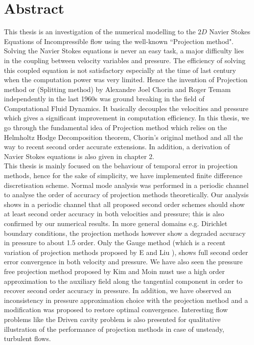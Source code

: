 \chapter*{Abstract}\label{abstract}




This thesis is an investigation of the numerical modelling to the $2D$ Navier Stokes Equations of Incompressible flow using the well-known ``Projection method". Solving the Navier Stokes equations is never an easy task, a major difficulty lies in the coupling between velocity variables and pressure. The efficiency of solving this coupled equation is not satisfactory especially at the time of last century when the computation power was very limited. Hence the invention of Projection method or (Splitting method) by Alexandre Joel Chorin and Roger Temam independently in the last 1960s was ground breaking in the field of Computational Fluid Dynamics. It basically decouples the velocities and pressure which gives a significant improvement in computation efficiency. In this thesis, we go through the fundamental idea of Projection method which relies on the Helmholtz Hodge Decomposition theorem, Chorin's original method and all the way to recent second order accurate extensions. In addition, a derivation of Navier Stokes equations is also given in chapter 2.\\

This thesis is mainly focused on the behaviour of temporal error in projection methods, hence for the sake of simplicity, we have implemented finite difference discretisation scheme. Normal mode analysis was performed in a periodic channel to analyse the order of accuracy of projection methods theoretically. Our analysis shows in a periodic channel that all proposed second order schemes should show at least second order accuracy in both velocities and pressure; this is also confirmed by our numerical results. In more general domains e.g. Dirichlet boundary conditions, the projection methods however show a degraded accuracy in pressure to about 1.5 order. Only the Gauge method (which is a recent variation of projection methods proposed by E and Liu \cite{weinan2003gauge,brown2001accurate,guermond2006overview}), shows full second order error convergence in both velocity and pressure. We have also seen the pressure free projection method proposed by Kim and Moin must use a high order approximation to the auxiliary field along the tangential component in order to recover second order accuracy in pressure. In addition, we have observed an inconsistency in pressure approximation choice with the projection method and a modification was proposed to restore optimal convergence. Interesting flow problems like the Driven cavity problem is also presented for qualitative illustration of the performance of projection methods in case of unsteady, turbulent flows.
